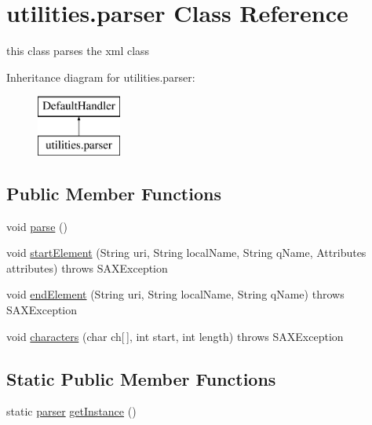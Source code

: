\hypertarget{classutilities_1_1parser}{}\section{utilities.\+parser Class Reference}
\label{classutilities_1_1parser}


this class parses the xml class  


Inheritance diagram for utilities.\+parser\+:\begin{figure}[H]
\begin{center}
\leavevmode
\includegraphics[height=2.000000cm]{classutilities_1_1parser}
\end{center}
\end{figure}
\subsection*{Public Member Functions}
\begin{DoxyCompactItemize}
\item 
void \hyperlink{classutilities_1_1parser_ae11f73c41940e9ee2d05b95ab2fb9435}{parse} ()
\item 
void \hyperlink{classutilities_1_1parser_a89378ec321afe4275ae9a6f5833e5fb9}{start\+Element} (String uri, String local\+Name, String q\+Name, Attributes attributes)  throws S\+A\+X\+Exception 
\item 
void \hyperlink{classutilities_1_1parser_a63a7843809987e45e5bb9bb790a1c8ff}{end\+Element} (String uri, String local\+Name, String q\+Name)  throws S\+A\+X\+Exception 
\item 
void \hyperlink{classutilities_1_1parser_aaf564dc89d2e86903538e014323d1482}{characters} (char ch\mbox{[}$\,$\mbox{]}, int start, int length)  throws S\+A\+X\+Exception 
\end{DoxyCompactItemize}
\subsection*{Static Public Member Functions}
\begin{DoxyCompactItemize}
\item 
static \hyperlink{classutilities_1_1parser}{parser} \hyperlink{classutilities_1_1parser_aca9b03d52069091a9fbe48ca5723a52c}{get\+Instance} ()
\end{DoxyCompactItemize}


